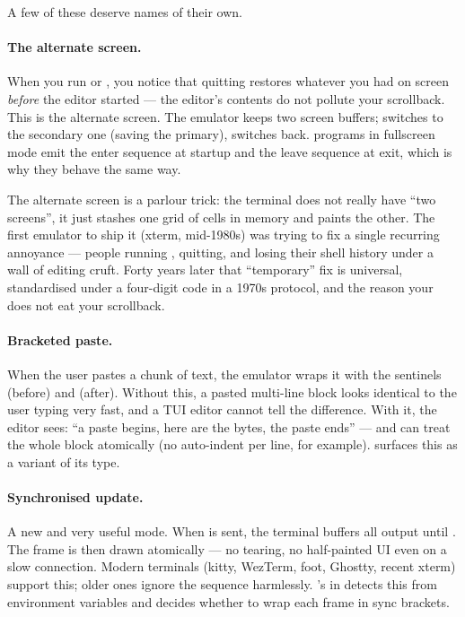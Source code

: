A few of these deserve names of their own.

\paragraph{The alternate screen.}
When you run  or , you notice that quitting
restores whatever you had on screen \emph{before} the editor started
--- the editor's contents do not pollute your scrollback. This is the
alternate screen. The emulator keeps two screen buffers;  switches to the secondary one (saving the primary), 
switches back. \maya{} programs in fullscreen mode emit the enter
sequence at startup and the leave sequence at exit, which is why they
behave the same way.

\begin{funfact}
The alternate screen is a parlour trick: the terminal does not really
have ``two screens'', it just stashes one grid of cells in memory and
paints the other. The first emulator to ship it (xterm, mid-1980s)
was trying to fix a single recurring annoyance --- people running
, quitting, and losing their shell history under a wall of
editing cruft. Forty years later that ``temporary'' fix is universal,
standardised under a four-digit code in a 1970s protocol, and the
reason your  does not eat your scrollback.
\end{funfact}


\paragraph{Bracketed paste.}
When the user pastes a chunk of text, the emulator wraps it with the
sentinels \code{ESC [ 200 \~{}} (before) and \code{ESC [ 201 \~{}}
(after). Without this, a pasted multi-line block looks identical to
the user typing very fast, and a TUI editor cannot tell the
difference. With it, the editor sees: ``a paste begins, here are the
bytes, the paste ends'' --- and can treat the whole block atomically
(no auto-indent per line, for example). \maya{} surfaces this as a
 variant of its  type.

\paragraph{Synchronised update.}
A new and very useful mode. When  is sent, the terminal
buffers all output until . The frame is then drawn
atomically --- no tearing, no half-painted UI even on a slow connection.
Modern terminals (kitty, WezTerm, foot, Ghostty, recent xterm)
support this; older ones ignore the sequence harmlessly. \maya{}'s
 in
 detects this from environment variables and
decides whether to wrap each frame in sync brackets.

